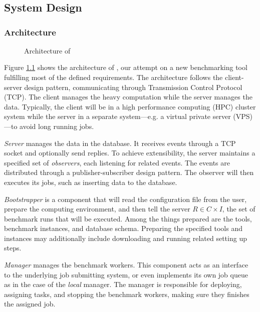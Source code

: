 \chapter{\chImplementation}
\label{ch:implementation}

\section{System Design}

\subsection{Architecture}

\begin{figure}
    \centering
    
    \caption{Architecture of \OurBenchmarkingTool}
    \label{fig:architecture}
\end{figure}

Figure \ref{fig:architecture} shows the architecture of \OurBenchmarkingTool, our attempt on a new benchmarking tool fulfilling most of the defined requirements.
The architecture follows the client-server design pattern, communicating through Transmission Control Protocol (TCP).
The client manages the heavy computation while the server manages the data.
Typically, the client will be in a high performance computing (HPC) cluster system while the server in a separate system---e.g. a virtual private server (VPS)---to avoid long running jobs.

\emph{Server} manages the data in the database.
It receives events through a TCP socket and optionally send replies.
To achieve extensibility, the server maintains a specified set of \emph{observers}, each listening for related events.
The events are distributed through a publisher-subscriber design pattern.
The observer will then executes its jobs, such as inserting data to the database.

\emph{Bootstrapper} is a component that will read the configuration file from the user, prepare the computing environment, and then tell the server $R \in C \times I$, the set of benchmark runs that will be executed.
Among the things prepared are the tools, benchmark instances, and database schema.
Preparing the specified tools and instances may additionally include downloading and running related setting up steps.

\emph{Manager} manages the benchmark workers.
This component acts as an interface to the underlying job submitting system, or even implements its own job queue as in the case of the \emph{local} manager.
The manager is responsible for deploying, assigning tasks, and stopping the benchmark workers, making sure they finishes the assigned job.

